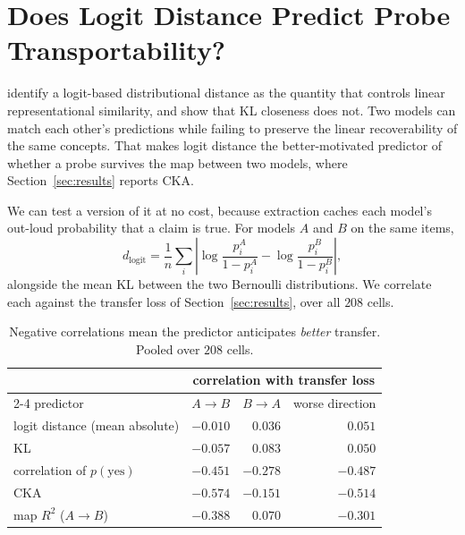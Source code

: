 \section{Does Logit Distance Predict Probe Transportability?}
\label{sec:appendix:logit}

\citet{nielsen2026logit} identify a logit-based distributional distance as the
quantity that controls linear representational similarity, and show that KL
closeness does not. Two models can match each other's predictions while failing
to preserve the linear recoverability of the same concepts. That makes logit
distance the better-motivated predictor of whether a probe survives the map
between two models, where Section~\ref{sec:results} reports CKA.

We can test a version of it at no cost, because extraction caches each model's
out-loud probability that a claim is true. For models $A$ and $B$ on the same
items,
\[
  d_{\mathrm{logit}} = \frac{1}{n}\sum_i
  \left| \log\frac{p^A_i}{1-p^A_i} - \log\frac{p^B_i}{1-p^B_i} \right| ,
\]
alongside the mean KL between the two Bernoulli distributions. We correlate each
against the transfer loss of Section~\ref{sec:results}, over all $208$ cells.

\begin{table}[h]
\centering
\small
\begin{tabular}{@{}lrrr@{}}
\toprule
 & \multicolumn{3}{c}{correlation with transfer loss} \\
\cmidrule(lr){2-4}
predictor & $A\!\to\!B$ & $B\!\to\!A$ & worse direction \\
\midrule
logit distance (mean absolute) & $-0.010$ & $0.036$ & $0.051$ \\
KL                             & $-0.057$ & $0.083$ & $0.050$ \\
correlation of $p(\text{yes})$ & $-0.451$ & $-0.278$ & $-0.487$ \\
CKA                            & $\mathbf{-0.574}$ & $-0.151$ & $\mathbf{-0.514}$ \\
map $R^2$ ($A\!\to\!B$)        & $-0.388$ & $0.070$ & $-0.301$ \\
\bottomrule
\end{tabular}
\caption{Negative correlations mean the predictor anticipates \emph{better}
transfer. Pooled over $208$ cells.}
\label{tab:logit-pooled}
\end{table}

